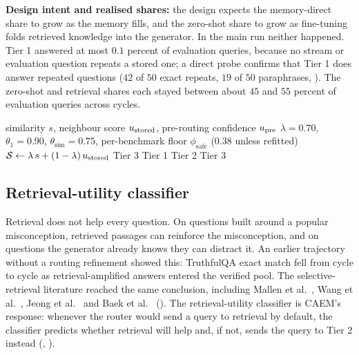 \textbf{Design intent and realised shares:} the design expects the memory-direct share to grow as the memory fills, and the zero-shot share to grow as fine-tuning folds retrieved knowledge into the generator. In the main run neither happened. Tier 1 answered at most $0.1$ percent of evaluation queries, because no stream or evaluation question repeats a stored one; a direct probe confirms that Tier 1 does answer repeated questions ($42$ of $50$ exact repeats, $19$ of $50$ paraphrases, ). The zero-shot and retrieval shares each stayed between about $45$ and $55$ percent of evaluation queries across cycles.




\begin{algorithm}[!htbp]
\caption[Three-tier router with safety override (Stage~3).]{Three-tier router with safety override (Stage~3).}
\label{alg:router}
\begin{algorithmic}[1]
\Require similarity $s$, neighbour score $u_{\text{stored}}$, pre-routing confidence $u_{\text{pre}}$
\Require $\lambda = 0.70$, $\theta_{1} = 0.90$, $\theta_{\text{sim}} = 0.75$, per-benchmark floor $\phi_{\text{safe}}$ ($0.38$ unless refitted)
\State $\mathcal{S} \gets \lambda\, s + (1-\lambda)\, u_{\text{stored}}$
    \State \Return Tier 3 
    \State \Return Tier 1
    \State \Return Tier 2
\Else
    \State \Return Tier 3 
\EndIf
\end{algorithmic}
\end{algorithm}

\subsection{Retrieval-utility classifier}
\label{sec:ruc}

Retrieval does not help every question. On questions built around a popular misconception, retrieved passages can reinforce the misconception, and on questions the generator already knows they can distract it. An earlier trajectory without a routing refinement showed this: TruthfulQA exact match fell from cycle to cycle as retrieval-amplified answers entered the verified pool. The selective-retrieval literature reached the same conclusion, including Mallen et al.~\cite{mallen2023whennot}, Wang et al.~\cite{wang2023skr}, Jeong et al.~\cite{jeong2024adaptive} and Baek et al.~\cite{baek2025probing} (). The retrieval-utility classifier is CAEM's response: whenever the router would send a query to retrieval by default, the classifier predicts whether retrieval will help and, if not, sends the query to Tier 2 instead (, ).

